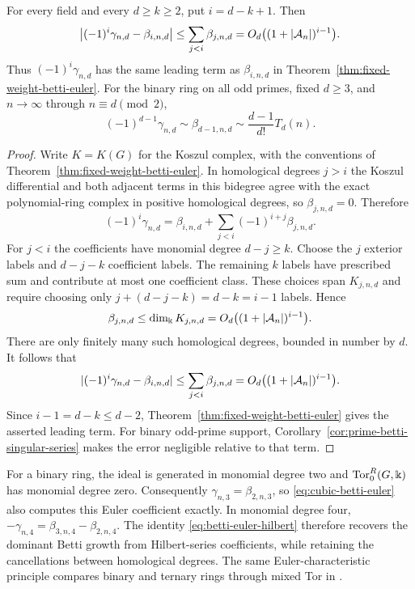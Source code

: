 \begin{corollary}
\label{cor:hilbert-euler-comparison}
For every field and every $d\ge k\ge2$, put $i=d-k+1$. Then
\[
 \bigl|(-1)^i\gamma_{n,d}-\beta_{i,n,d}\bigr|
 \le\sum_{j<i}\beta_{j,n,d}
 =O_d\bigl((1+|\mathcal A_n|)^{i-1}\bigr).
\]
Thus $(-1)^i\gamma_{n,d}$ has the same leading term as
$\beta_{i,n,d}$ in Theorem~\ref{thm:fixed-weight-betti-euler}.
For the binary ring on all odd primes, fixed $d\ge3$, and
$n\to\infty$ through $n\equiv d\pmod2$,
\[
 (-1)^{d-1}\gamma_{n,d}\sim\beta_{d-1,n,d}
 \sim\frac{d-1}{d!}T_d(n).
\]
\end{corollary}
\begin{proof}
Write $K=K(G)$ for the Koszul complex, with the conventions of
Theorem~\ref{thm:fixed-weight-betti-euler}.
In homological degrees $j>i$ the Koszul differential and both adjacent terms
in this bidegree agree with the exact polynomial-ring complex in
positive homological degrees, so $\beta_{j,n,d}=0$. Therefore
\[
 (-1)^i\gamma_{n,d}=\beta_{i,n,d}
       +\sum_{j<i}(-1)^{i+j}\beta_{j,n,d}.
\]
For $j<i$ the coefficients have monomial degree
$d-j\ge k$. Choose the $j$ exterior labels and $d-j-k$ coefficient
labels. The remaining $k$ labels have prescribed sum and contribute
at most one coefficient class. These choices span $K_{j,n,d}$ and require
choosing only $j+(d-j-k)=d-k=i-1$ labels. Hence
\[
 \beta_{j,n,d}\le\dim_\Bbbk K_{j,n,d}
   =O_d\bigl((1+|\mathcal A_n|)^{i-1}\bigr).
\]
There are only finitely many such homological degrees, bounded in number by $d$.
It follows that
\[
 |(-1)^i\gamma_{n,d}-\beta_{i,n,d}|
 \le\sum_{j<i}\beta_{j,n,d}
 =O_d\bigl((1+|\mathcal A_n|)^{i-1}\bigr).
\]
Since $i-1=d-k\le d-2$, Theorem~\ref{thm:fixed-weight-betti-euler}
gives the asserted leading term. For binary odd-prime support,
Corollary~\ref{cor:prime-betti-singular-series} makes the error
negligible relative to that term.
\end{proof}

For a binary ring, the ideal is generated in monomial degree two
and $\operatorname{Tor}_0^R(G,\Bbbk)$ has monomial degree zero. Consequently
$\gamma_{n,3}=\beta_{2,n,3}$, so \eqref{eq:cubic-betti-euler}
also computes this Euler coefficient exactly. In monomial degree four,
$-\gamma_{n,4}=\beta_{3,n,4}-\beta_{2,n,4}$.
The identity \eqref{eq:betti-euler-hilbert} therefore recovers
the dominant Betti growth from Hilbert-series coefficients, while
retaining the cancellations between homological degrees.
The same Euler-characteristic principle compares binary and ternary
rings through mixed Tor in \cite{CompanionTopology}.
